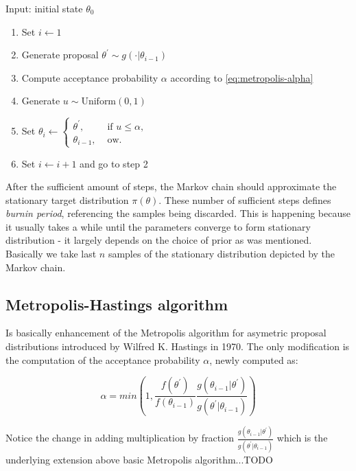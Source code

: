 \documentclass[
  digital, %
  oneside, %
  lof,     %
  lot,     %
]{fithesis4}
\begin{document}
Input: initial state $\theta_0$

\begin{enumerate}
  \item Set $i \leftarrow 1$
  \item Generate proposal $\theta^\prime \sim g(\cdot | \theta_{i-1})$
  \item Compute acceptance probability $\alpha$ according to \eqref{eq:metropolis-alpha}
  \item Generate $u \sim \text{Uniform}(0, 1)$
  \item Set $\theta_{i} \leftarrow \begin{cases}
    \theta^\prime, & \text{ if } u \leq \alpha,\\
    \theta_{i-1}, & \text{ ow.}
    \end{cases}
    $
  \item Set $i \leftarrow i + 1$ and go to step 2
\end{enumerate}


After the sufficient amount of steps, the Markov 
chain should approximate the stationary target 
distribution $\pi(\theta)$. These number of 
sufficient steps defines \textit{burnin period}, 
referencing the samples being discarded. This 
is happening because it usually takes a while 
until the parameters converge to form 
stationary distribution - it largely 
depends on the choice of prior as was mentioned. 
Basically we take last $n$ samples of the 
stationary distribution depicted by the 
Markov chain.


\subsection{Metropolis-Hastings algorithm}

Is basically enhancement of the Metropolis algorithm 
for asymetric proposal distributions introduced by 
Wilfred K. Hastings in 1970. 
The only modification is the computation of the acceptance 
probability $\alpha$, newly computed as:

\begin{equation}
  \alpha = min\left(1, \frac{f(\theta^{\prime})}{f(\theta_{i-1})} \frac{g(\theta_{i-1} | \theta^{\prime})}{g(\theta^{\prime} | \theta_{i-1})}\right)  
\end{equation}

Notice the change in adding multiplication by fraction 
$\frac{g(\theta_{i-1} | \theta^{\prime})}{g(\theta^{\prime} | \theta_{i-1})}$ 
which is the underlying extension above basic Metropolis 
algorithm...TODO
\end{document}
